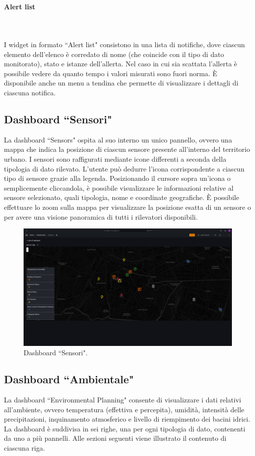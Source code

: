\documentclass[8pt]{article}
\newcommand{\subsubsubsection}[1]{\paragraph{#1}\mbox{}\\\\}
\begin{document}
\subsubsubsection{Alert list}
I widget in formato ``Alert list" consistono in una lista di notifiche, dove ciascun elemento dell'elenco è corredato di nome (che coincide con il tipo di dato monitorato), stato e istanze dell'allerta. Nel caso in cui sia scattata l'allerta è possibile vedere da quanto tempo i valori misurati sono fuori norma. È disponibile anche un menu a tendina che permette di visualizzare i dettagli di ciascuna notifica.

\subsection{Dashboard ``Sensori"}
La dashboard ``Sensors" ospita al suo interno un unico pannello, ovvero una mappa che indica la posizione di ciascun sensore presente all'interno del territorio urbano. I sensori sono raffigurati mediante icone differenti a seconda della tipologia di dato rilevato. L'utente può dedurre l'icona corrispondente a ciascun tipo di sensore grazie alla legenda. Posizionando il cursore sopra un'icona o semplicemente cliccandola, è possibile visualizzare le informazioni relative al sensore selezionato, quali tipologia, nome e coordinate geografiche. È possibile effettuare lo zoom sulla mappa per visualizzare la posizione esatta di un sensore o per avere una visione panoramica di tutti i rilevatori disponibili.
\begin{figure}[H]
    \centering
    \includegraphics[width=15cm]{images_mu/sensors.png}
    \caption{Dashboard ``Sensori".}
    \label{fig:Dashboard ``Sensori"}
\end{figure}
\subsection{Dashboard ``Ambientale"}
La dashboard ``Environmental Planning" consente di visualizzare i dati relativi all'ambiente, ovvero temperatura (effettiva e percepita), umidità, intensità delle precipitazioni, inquinamento atmosferico e livello di riempimento dei bacini idrici. La dashboard è suddivisa in sei righe, una per ogni tipologia di dato, contenenti da uno a più pannelli. Alle sezioni seguenti viene illustrato il contenuto di ciascuna riga.
\end{document}
